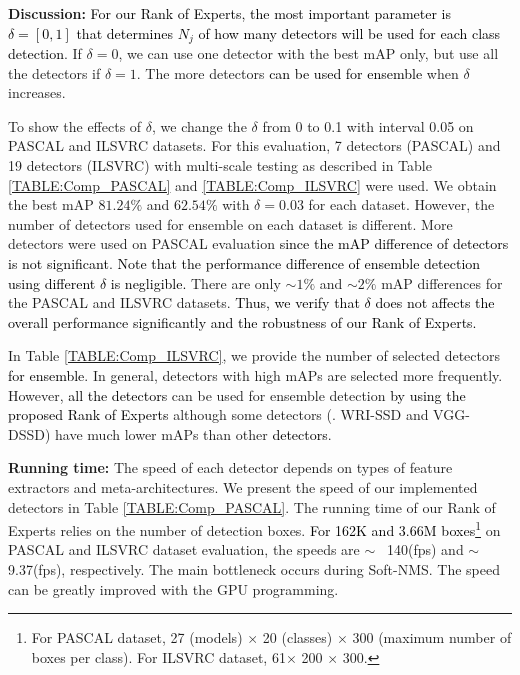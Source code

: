 \documentclass[10pt,twocolumn,letterpaper]{article}
\newcommand{\RV}{\textcolor{black}}
\begin{document}
\textbf{Discussion:} 
\RV{For our Rank of Experts, the most important parameter is $\delta= [0,1]$ that determines $N_{j}$ of how many detectors will be used for each class detection}.  If $\delta=0$, we can use one detector with the best mAP only, but use all the detectors if $\delta=1$. The more detectors \RV{can be used for ensemble} when $\delta$ increases. 


To show the effects of $\delta$, we change the $\delta$ from 0 to 0.1 with interval 0.05 on PASCAL and ILSVRC datasets. For this evaluation, 7 detectors (PASCAL) and 19 detectors (ILSVRC) with multi-scale testing as described in Table \ref{TABLE:Comp_PASCAL} and \ref{TABLE:Comp_ILSVRC} were used. We obtain the best mAP $81.24\%$ and $62.54\%$ with $\delta=0.03$ for each dataset. However, the number of detectors used for ensemble on each dataset is different. More detectors were used on PASCAL evaluation \RV{since the mAP difference of detectors is not significant}. \RV{Note that the performance difference of ensemble detection  using different $\delta$ is negligible.} There are only  $\sim 1\%$ and $\sim 2\%$ mAP differences for the PASCAL and ILSVRC datasets. \RV{Thus, we verify that $\delta$ does not affects the overall performance significantly and the robustness of our \RV{Rank of Experts}.}


In Table \ref{TABLE:Comp_ILSVRC}, we provide the number of selected detectors \RV{for ensemble}. In general, detectors with high mAPs are selected more frequently. However, \RV{all the detectors} can be used for ensemble detection \RV{by using the proposed Rank of Experts} although some detectors (\ie. WRI-SSD and VGG-DSSD) have much lower mAPs than other \RV{detectors}. 

\textbf{Running time:}
The speed of each detector depends on types of feature extractors and meta-architectures. We present the speed of our implemented detectors in Table \ref{TABLE:Comp_PASCAL}. The running time of our Rank of Experts relies on the number of detection boxes. \RV{For 162K and 3.66M boxes}\footnote{For PASCAL dataset, 27 (models) $\times$ 20 (classes) $\times$ 300 (maximum number of boxes per class). For ILSVRC dataset, 61$\times$ 200  $\times$ 300.} on PASCAL and ILSVRC dataset evaluation, the speeds are $\sim$ ~140(fps) and  $\sim$ 9.37(fps), respectively. The main bottleneck occurs during Soft-NMS. The speed can be greatly improved with the GPU programming.
\end{document}

